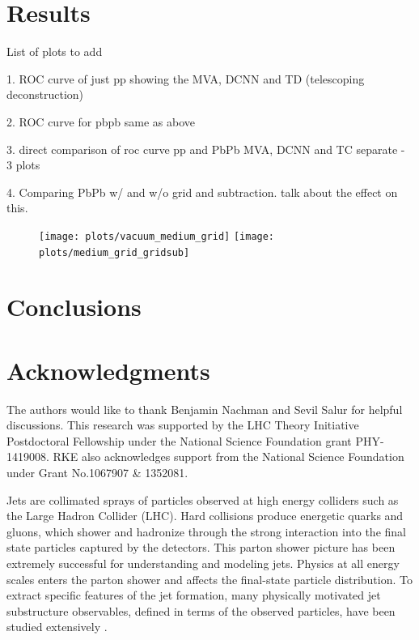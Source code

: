\documentclass[notoc]{JHEP3}
\begin{document}
\section{Results}
\label{sec:results}

	
	List of plots to add
	
	1. ROC curve of just pp showing the MVA, DCNN and TD (telescoping deconstruction)

	2. ROC curve for pbpb same as above
	
	3. direct comparison of roc curve pp and PbPb MVA, DCNN and TC separate - 3 plots
	
	4. Comparing PbPb w/ and w/o grid and subtraction. talk about the effect on this.
	
    \begin{figure}
	   \centering
	   \texttt{[image: plots/vacuum\_medium\_grid]}
	   \texttt{[image: plots/medium\_grid\_gridsub]}
	   \caption{}
	   \label{fig:tjet}
	\end{figure}


\section{Conclusions}
\label{sec:conc}


\section*{Acknowledgments}
The authors would like to thank Benjamin Nachman and Sevil Salur for helpful discussions. This research was supported by the LHC Theory Initiative Postdoctoral Fellowship under the National Science Foundation grant PHY-1419008. RKE also acknowledges support from the National Science Foundation under Grant No.1067907 \& 1352081.

\appendix

Jets are collimated sprays of
particles observed at high energy colliders such as the Large Hadron Collider (LHC). Hard collisions produce energetic quarks and gluons, which shower and hadronize through the strong interaction into the final state particles captured by the detectors. This parton shower picture has been extremely successful for understanding and modeling jets. Physics at all energy scales enters %
the parton shower and affects the final-state particle distribution. To extract specific features of the jet formation, many
physically motivated jet substructure observables, defined in terms of the observed particles, have been studied extensively \cite{Abdesselam:2010pt,Altheimer:2012mn,Altheimer:2013yza,Adams:2015hiv,Larkoski:2017jix,ATLAS-CONF-2017-064,Khachatryan:1955546}.
\end{document}

